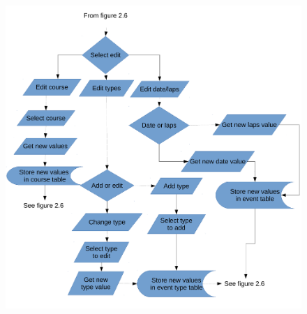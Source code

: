 \begin{figure}[H]
	\includegraphics[width=\textwidth]{./FlowChart/SectionFive.pdf}
	\caption{} \label{fig:} 	
\end{figure}

